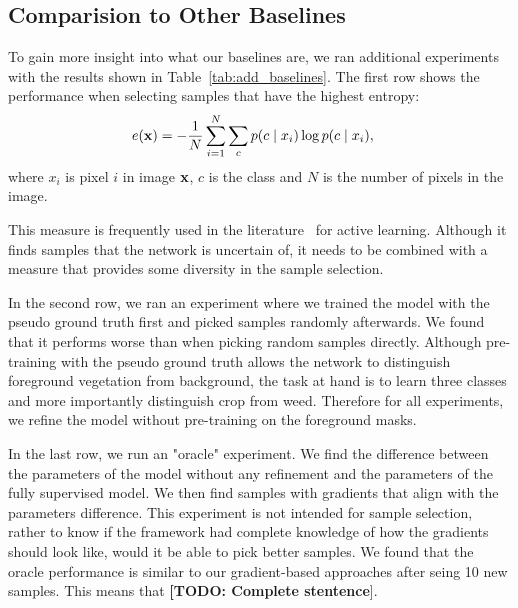 \documentclass[letterpaper, 10 pt, conference]{ieeeconf}  %
\newcommand\todo[1]{\textbf{[TODO: #1}]}
\begin{document}
\subsection{Comparision to Other Baselines}
    
To gain more insight into what our baselines are, we ran additional experiments with the results shown in Table~\ref{tab:add_baselines}. 
The first row shows the performance when selecting samples that have the highest entropy:
\begin{align}
e(\bold{x}) &= -\frac{1}{N} \sum_{i=1}^N \sum_{c} p(c \mid x_i) \log p(c \mid x_i),
\end{align}  
\noindent
where $x_i$ is pixel $i$ in image $\bold{x}$, $c$ is the class and $N$ is the number of pixels in the image.

This measure is frequently used in the literature~\cite{chakraborty2015active, zhou2017fine} for active learning. Although it finds samples that the network is uncertain of, it needs to be combined with a measure that provides some diversity in the sample selection. 


In the second row, we ran an experiment where we trained the model with the pseudo ground truth first and picked samples randomly afterwards. We found that it performs worse than when picking random samples directly. Although pre-training with the pseudo ground truth allows the network to distinguish foreground vegetation from background, the task at hand is to learn three classes and more importantly distinguish crop from weed. Therefore for all experiments, we refine the model without pre-training on the foreground masks.

In the last row, we run an "oracle" experiment. We find the difference between the parameters of the model without any refinement and the parameters of the fully supervised model. We then find samples with gradients that align with the parameters difference. This experiment is not intended for sample selection, rather to know if the framework had complete knowledge of how the gradients should look like, would it be able to pick better samples. We found that the oracle performance is similar to our gradient-based approaches after seing 10 new samples. This means that \todo{Complete stentence}.
\end{document}
